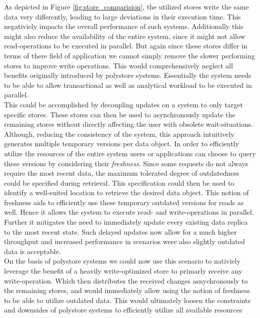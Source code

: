 As depicted in Figure \ref{fig:store_comparision}, the utilized stores write the same data very differently, leading to large deviations in their execution time. 
This negativiely impacts the overall performance of such systems.
Additionally this might also reduce the availability of the entire system, since it might not allow read-operations to be executed in parallel. 
But again since these stores differ in terms of there field of application we cannot simply remove the slower performing stores to improve write operations. 
This would comprehensively neglect all benefits originally introduced by polystore systems.
Essentially the system needs to be able to allow transactional as well as analytical workload to be executed in parallel.\\
This could be accomplished by decoupling updates on a system to only target specific stores. These stores can then be used to asynchronously update
the remaining stores without directly affecting the user with obsolete wait-situations.\\
Although, reducing the consistency of the system, this approach intuitively generates multiple temporary versions per data object.
In order to efficiently utilize the resources of the entire system users or applications can choose to query these versions by
considering their \emph{freshness}.
Since some requests do not always require the most recent data, the maximum tolerated degree of outdatedness could be specified during retrieval.
This specification could then be used to identify a well-suited location to retrieve the desired data object. 
This notion of freshness aids to efficiently use these temporary outdated versions for reads as well. 
Hence it allows the system to execute read- and write-operations in parallel.
Further it mitigates the need to immediately update every existing data replica to the most recent state.
Such delayed updates now allow for a much higher throughput and increased performance in scenarios were also slightly 
outdated data is acceptable.\\
On the basis of polystore systems we could now use this scenario to nativiely leverage the benefit of a heavily write-optimized store to 
primarly receive any write-operation.
Which then distributes the received changes asnychronously to the remaining stores, and
would immediately allow using the notion of freshness to be able to utilize outdated data.
This would ultimately loosen the constraints and downsides of polystore systems to efficiently utilize all available resources




